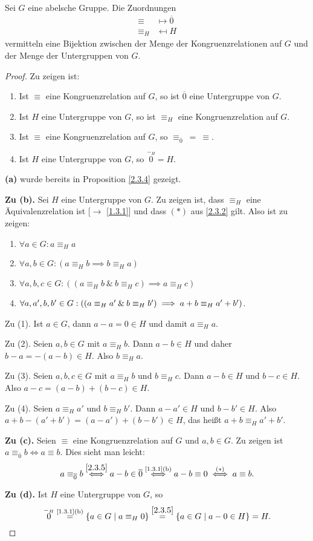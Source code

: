 \documentclass[../../main.tex]{subfiles}
\begin{document}
\begin{sat}\text{\rm[$\to$\ref{1.3.6}]} \label{2.3.6} Sei $G$ eine abelsche Gruppe. Die Zuordnungen
\begin{align*}
\equiv&\mapsto\overline0\\
\equiv_H&\mapsfrom H
\end{align*}
vermitteln eine Bijektion zwischen der Menge der Kongruenzrelationen auf $G$ und der Menge der Untergruppen von $G$.
\end{sat}
\begin{proof}
Zu zeigen ist:
\begin{enumerate}[\normalfont(a)]
\item Ist $\equiv$ eine Kongruenzrelation auf $G$, so ist $\overline0$ eine Untergruppe von $G$.
\item Ist $H$ eine Untergruppe von $G$, so ist $\equiv_H$ eine Kongruenzrelation auf $G$.
\item Ist $\equiv$ eine Kongruenzrelation auf $G$, so $\equiv_{\overline0}~=~\equiv$.
\item Ist $H$ eine Untergruppe von $G$, so $\overset{-_H}0=H$.
\end{enumerate}
\medskip\noindent
{\bf (a)} wurde bereits in Proposition \ref{2.3.4} gezeigt. 

\medskip\noindent
{\bf Zu (b).} Sei $H$ eine Untergruppe von $G$. Zu zeigen ist, dass $\equiv_H$ eine Äquivalenzrelation ist [$\to$ \ref{1.3.1}] und dass $(*)$ aus \ref{2.3.2} gilt. Also ist zu zeigen:
\begin{enumerate}[(1)]
\item $\forall a\in G:a\equiv_H a$
\item $\forall a,b\in G:(a\equiv_Hb\implies b\equiv_Ha)$
\item $\forall a,b,c\in G:((a\equiv_Hb~\&~b\equiv_Hc)\implies a\equiv_H c)$
\item $\forall a,a',b,b'\in G:((a\equiv_Ha'\mathbin{\&} b\equiv_Hb')\implies a+b\equiv_Ha'+b')$.
\end{enumerate}

Zu (1). Ist $a\in G$, dann $a-a=0\in H$ und damit $a\equiv_H a$.

Zu (2). Seien $a,b\in G$ mit $a\equiv_Hb$. Dann $a-b\in H$ und daher $b-a=-(a-b)\in H$. Also $b\equiv_Ha$.

Zu (3). Seien $a,b,c\in G$ mit $a\equiv_Hb$ und $b\equiv_Hc$. Dann $a-b\in H$ und $b-c\in H$. Also $a-c=(a-b)+(b-c)\in H$.

Zu (4). Seien $a\equiv_Ha'$ und $b\equiv_Hb'$. Dann $a-a'\in H$ und $b-b'\in H$. Also $a+b-(a'+b')=(a-a')+(b-b')\in H$, das heißt $a+b\equiv_Ha'+b'$.

\medskip\noindent
{\bf Zu (c).} Seien $\equiv$ eine Kongruenzrelation auf $G$ und $a,b\in G$. Zu zeigen ist $a\equiv_{\overline0}b\iff a\equiv b$. Dies sieht man leicht:
$$a\equiv_{\overline0}b\overset{\ref{2.3.5}}\iff a-b\in\overline0\overset{\text{\ref{1.3.1}(b)}}\iff a-b\equiv0\overset{(*)}\iff a\equiv b.$$

\medskip\noindent
{\bf Zu (d).} Ist $H$ eine Untergruppe von $G$, so  $$\overset{-_H}0\overset{\text{\ref{1.3.1}(b)}}=\{a\in G\mid a\equiv_H0\}\overset{\ref{2.3.5}}=\{a\in G\mid a-0\in H\}=H.$$
\end{proof}
\end{document}
